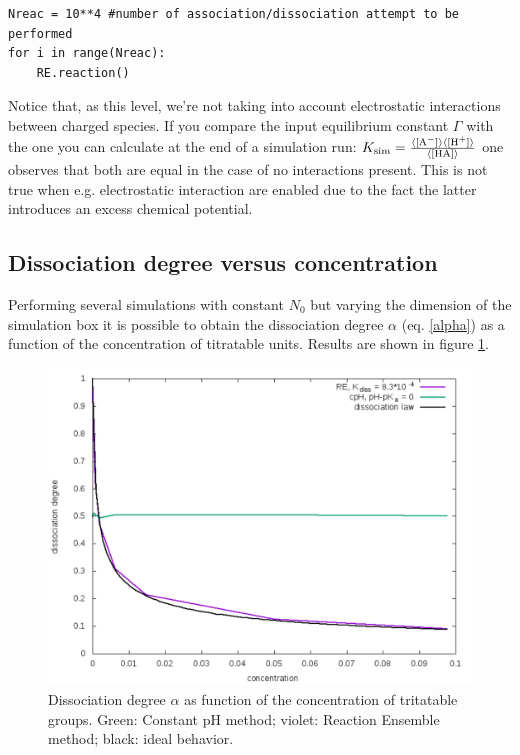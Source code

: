 \documentclass[
a4paper,                        %
11pt,                           %
twoside,                        %
footsepline,                    %
headsepline,                    %
headexclude,                    %
footexclude,                    %
pagesize,                       %
]{scrartcl}
\begin{document}
\begin{verbatim}
Nreac = 10**4 #number of association/dissociation attempt to be performed
for i in range(Nreac):
    RE.reaction()
\end{verbatim}

Notice that, as this level, we're not taking into account electrostatic interactions between charged species. If  you compare the input equilibrium constant $\Gamma$ with the one you can calculate at the end of a simulation run: $K_{\text{sim}} = \frac{\langle[\ce{A-}]\rangle \langle[\ce{H+}]\rangle}{\langle[\ce{HA}]\rangle}$ one observes that both are equal in the case of no interactions present. This is not true when e.g. electrostatic interaction are enabled due to the fact the latter introduces an excess chemical potential.


\subsection{Dissociation degree versus concentration}

Performing several simulations with constant $N_0$ but varying the dimension of the simulation box it is possible to obtain the dissociation degree $\alpha$ (eq. \ref{alpha}) as a function of the concentration of titratable units. Results are shown in figure \ref{alpha_vs_C}.

\begin{figure}[tb]
	\centering
 	\includegraphics[scale=0.6]{figures/alpha_vs_C.pdf}
 	\caption{Dissociation degree $\alpha$ as function of the concentration of tritatable groups. Green: Constant pH method; violet: Reaction Ensemble method; black: ideal behavior.}
 	\label{alpha_vs_C}
\end{figure}
\end{document}
